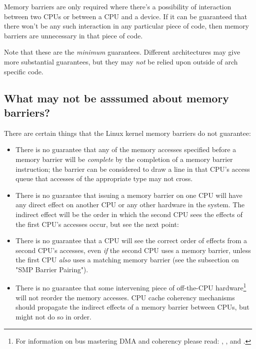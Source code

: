 Memory barriers are only required where there's a possibility of interaction
between two CPUs or between a CPU and a device.
If it can be guaranteed that there won't be any such interaction in any
particular piece of code, then memory barriers are unnecessary in that
piece of code.


Note that these are the \emph{minimum} guarantees.
Different architectures may give more substantial guarantees, but they
may \emph{not} be relied upon outside of arch specific code.


\subsection{What may not be asssumed about memory barriers?}

There are certain things that the Linux kernel memory barriers do not guarantee:

\begin{itemize}
 \item
     There is no guarantee that any of the memory accesses specified before a
     memory barrier will be \emph{complete} by the completion of a memory
     barrier instruction; the barrier can be considered to draw a line in
     that CPU's access queue that accesses of the appropriate type may not
     cross.

 \item
     There is no guarantee that issuing a memory barrier on one CPU will have
     any direct effect on another CPU or any other hardware in the system.
     The indirect effect will be the order in which the second CPU sees the
     effects of the first CPU's accesses occur, but see the next point:

 \item
     There is no guarantee that a CPU will see the correct order of effects
     from a second CPU's accesses, even \emph{if} the second CPU uses a memory
     barrier, unless the first CPU \emph{also} uses a matching memory barrier
     (see the subsection on "SMP Barrier Pairing").

 \item
     There is no guarantee that some intervening piece of off-the-CPU
     hardware\footnote{
	For information on bus mastering DMA and coherency please read:
	,
	, and
	.}
     will not reorder the memory accesses.
     CPU cache coherency mechanisms should propagate the indirect effects
     of a memory barrier between CPUs, but might not do so in order.
\end{itemize}

